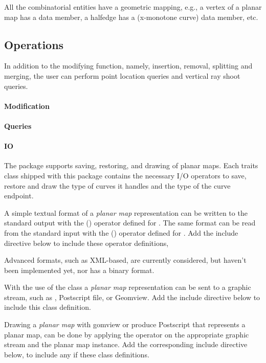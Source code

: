 All the combinatorial entities have a geometric mapping, e.g.,
a vertex of a planar map has a  data member, a halfedge has
a  (x-monotone curve) data member, etc.

\subsection*{Operations}
In addition to the modifying function, namely, insertion, removal,
splitting and merging, the user can perform point location queries and
vertical ray shoot queries.

\paragraph{Modification}
\paragraph{Queries}
\paragraph{IO}
The  package supports saving, restoring, and drawing
of planar maps. Each traits class shipped with this package contains
the necessary I/O operators to save, restore and draw the type of
curves it handles and the type of the curve endpoint.

A simple textual format of a {\em planar map} representation can be
written to the standard output with the  (\ccc{ >> })
operator defined for . The same format can be read
from the standard input with the  (\ccc{ << }) operator
defined for . Add the include directive below to
include these operator definitions,


Advanced formats, such as XML-based, are currently considered, but
haven't been implemented yet, nor has a binary format.

With the use of the  class a {\em planar map}
representation can be sent to a graphic stream, such as
, Postscript file, or Geomview. Add the include
directive below to include this class definition.


Drawing a {\em planar map} with gomview or produce Postscript that
represents a planar map, can be done by applying the 
operator on the appropriate graphic stream and the planar map
instance. Add the corresponding include directive below, to include
any if these class definitions.

